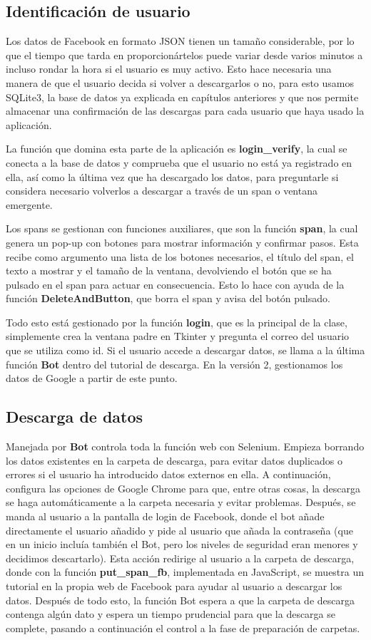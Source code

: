 \subsection{Identificación de usuario}
Los datos de Facebook en formato JSON tienen un tamaño considerable, por lo que el tiempo que tarda en proporcionártelos puede variar desde varios minutos a incluso rondar la hora si el usuario es muy activo. Esto hace necesaria una manera de que el usuario decida si volver a descargarlos o no, para esto usamos SQLite3, la base de datos ya explicada en capítulos anteriores y que nos permite almacenar una confirmación de las descargas para cada usuario que haya usado la aplicación. 

La función que domina esta parte de la aplicación es \textbf{login\_verify}, la cual se conecta a la base de datos y comprueba que el usuario no está ya registrado en ella, así como la última vez que ha descargado los datos, para preguntarle si considera necesario volverlos a descargar a través de un span o ventana emergente. 

Los spans se gestionan con funciones auxiliares, que son la función \textbf{span}, la cual genera un pop-up con botones para mostrar información y confirmar pasos. Esta recibe como argumento una lista de los botones necesarios, el título del span, el texto a mostrar y el tamaño de la ventana, devolviendo el botón que se ha pulsado en el span para actuar en consecuencia. Esto lo hace con ayuda de la función \textbf{DeleteAndButton}, que borra el span y avisa del botón pulsado.

Todo esto está gestionado por la función \textbf{login}, que es la principal de la clase, simplemente crea la ventana padre en Tkinter y pregunta el correo del usuario que se utiliza como id. Si el usuario accede a descargar datos, se llama a la última función \textbf{Bot} dentro del tutorial de descarga. En la versión 2, gestionamos los datos de Google a partir de este punto.

\subsection{Descarga de datos}
Manejada por \textbf{Bot} controla toda la función web con Selenium. Empieza borrando los datos existentes en la carpeta de descarga, para evitar datos duplicados o errores si el usuario ha introducido datos externos en ella. A continuación, configura las opciones de Google Chrome para que, entre otras cosas, la descarga se haga automáticamente a la carpeta necesaria y evitar problemas. Después, se manda al usuario a la pantalla de login de Facebook, donde el bot añade directamente el usuario añadido y pide al usuario que añada la contraseña (que en un inicio incluía también el Bot, pero los niveles de seguridad eran menores y decidimos descartarlo). Esta acción redirige al usuario a la carpeta de descarga, donde con la función \textbf{put\_span\_fb}, implementada en JavaScript, se muestra un tutorial en la propia web de Facebook para ayudar al usuario a descargar los datos. Después de todo esto, la función Bot espera a que la carpeta de descarga contenga algún dato y espera un tiempo prudencial para que la descarga se complete, pasando a continuación el control a la fase de preparación de carpetas.

